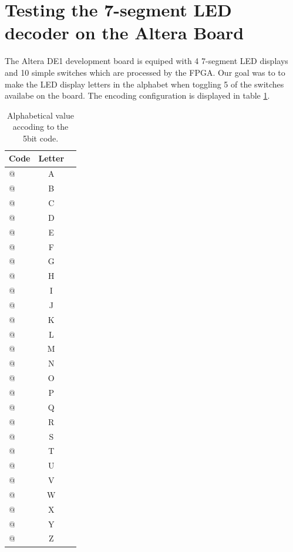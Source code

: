 \documentclass[10pt]{article}
\begin{document}
\section*{Testing the 7-segment LED decoder on the Altera Board}
The Altera DE1 development board is equiped with 4 7-segment LED displays and 10 simple switches which are processed by the FPGA. Our goal was to  to make the LED display letters in the alphabet when toggling 5 of the switches availabe on the board. The encoding configuration is displayed in table \ref{tab:alph_label}.
\begin{table}[!htb]
    \caption{Alphabetical value accoding to the 5bit code.}
    \label{tab:alph_label}
    \centering
    \begin{tabular}{l|cc}
    \hline
    \hline
    \textbf{Code} & \textbf{Letter}\\
    \hline
        \verb@00000@ & A \\
        \verb@00001@ & B \\
        \verb@00010@ & C \\
        \verb@00011@ & D \\
        \verb@00100@ & E \\
        \verb@00101@ & F \\
        \verb@00110@ & G \\
        \verb@00111@ & H\\
        \verb@01000@ & I\\
        \verb@01001@ & J\\
        \verb@01010@ & K\\
        \verb@01011@ & L\\
        \verb@01100@ & M\\
        \verb@01101@ & N\\
        \verb@01110@ & O\\
        \verb@01111@ & P\\
        \verb@10000@ & Q\\
        \verb@10001@ & R\\
        \verb@10010@ & S\\
        \verb@10011@ & T\\
        \verb@10100@ & U\\
        \verb@10101@ & V\\
        \verb@10110@ & W\\
        \verb@10111@ & X\\
        \verb@11000@ & Y\\
        \verb@11001@ & Z\\
    \hline
    \hline
    \end{tabular}
\end{table}
\end{document}
